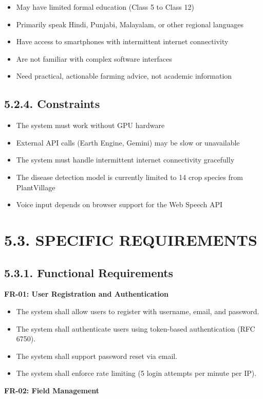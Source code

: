 \documentclass[12pt, a4paper]{report}
\begin{document}
\begin{itemize}[leftmargin=*]
  \item May have limited formal education (Class 5 to Class 12)
  \item Primarily speak Hindi, Punjabi, Malayalam, or other regional languages
  \item Have access to smartphones with intermittent internet connectivity
  \item Are not familiar with complex software interfaces
  \item Need practical, actionable farming advice, not academic information
\end{itemize}
\subsection{5.2.4. Constraints}
\begin{itemize}[leftmargin=*]
  \item The system must work without GPU hardware
  \item External API calls (Earth Engine, Gemini) may be slow or unavailable
  \item The system must handle intermittent internet connectivity gracefully
  \item The disease detection model is currently limited to 14 crop species from PlantVillage
  \item Voice input depends on browser support for the Web Speech API
\end{itemize}
\section{5.3. SPECIFIC REQUIREMENTS}
\subsection{5.3.1. Functional Requirements}
\textbf{FR-01: User Registration and Authentication}

\begin{itemize}[leftmargin=*]
  \item The system shall allow users to register with username, email, and password.
  \item The system shall authenticate users using token-based authentication (RFC 6750).
  \item The system shall support password reset via email.
  \item The system shall enforce rate limiting (5 login attempts per minute per IP).
\end{itemize}
\textbf{FR-02: Field Management}
\end{document}
